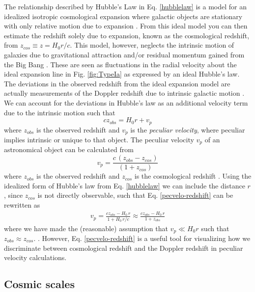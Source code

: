 The relationship described by Hubble's Law in Eq. \ref{hubblelaw} is a model for an idealized isotropic cosmological expansion where galactic objects are stationary with only relative motion due to expansion \cite{Hogg1999:DistanceMeas+GenRef}. From this ideal model you can then estimate the redshift solely due to expansion, known as the cosmological redshift, from $z_{cos}\equiv z={{H_0r}/c}$. This model, however, neglects the intrinsic motion of galaxies due to gravitational attraction and/or residual momentum gained from the Big Bang \cite{Feldman2008}\cite{Watkins2007}. These are seen as fluctuations in the radial velocity about the ideal expansion line in Fig. \ref{fig:TypeIa} as expressed by an ideal Hubble's law. The deviations in the observed redshift from the ideal expansion model are actually measurements of the Doppler redshift due to intrinsic galactic motion \cite{Hogg1999:DistanceMeas+GenRef}\cite{Carroll2001-CosmoReview+SNeIa+Lum}. We can account for the deviations in Hubble's law as an additional velocity term due to the intrinsic motion such that
%
\begin{equation}
cz_{obs} = H_0 r + v_p
\end{equation}
%
where $z_{obs}$ is the observed redshift and $v_p$ is the \textit{peculiar velocity}, where peculiar implies intrinsic or unique to that object. The peculiar velocity $v_p$ of an astronomical object can be calculated from
%
\begin{equation}\label{pecvelo-redshift}
v_p = \frac{c\,(z_{obs} - z_{cos})}{(1+z_{cos})}
\end{equation}
%
where $z_{obs}$ is the observed redshift and $z_{cos}$ is the cosmological redshift \cite{Hogg1999:DistanceMeas+GenRef}. Using the idealized form of Hubble's law from Eq. \ref{hubblelaw} we can include the distance $r$, since $z_{cos}$ is not directly observable, such that Eq. \ref{pecvelo-redshift} can be rewritten as
%
\begin{eqnarray}
v_p = \frac{cz_{obs} - {H_0\, r}}{1+{H_0\, r}/c} \approx \frac{cz_{obs} - H_0\, r}{1+z_{obs}}
\end{eqnarray}
%
where we have made the (reasonable) assumption that $v_p \ll H_0 r$ such that $z_{obs} \approx z_{cos}$. \cite{Watkins2015:BulkFlow+CF2}\cite{Watkins2015:UnbiasedEstimator}.
However, Eq. \ref{pecvelo-redshift} is a useful tool for visualizing how we discriminate between cosmological redshift and the Doppler redshift in peculiar velocity calculations.



\subsection{Cosmic scales}


